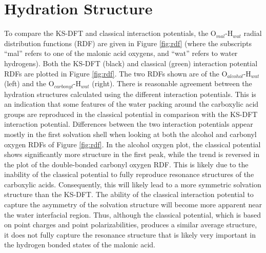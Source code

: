 \section {Hydration Structure}

To compare the KS-DFT and classical interaction potentials, the O$_{mal}$-H$_{wat}$ radial distribution functions (RDF) are given in Figure \ref{fig:rdf} (where the subscripts ``mal'' refers to one of the malonic acid oxygens, and ``wat'' refers to water hydrogens). Both the KS-DFT (black) and classical (green) interaction potential RDFs are plotted in Figure \ref{fig:rdf}. The two RDFs shown are of the O$_{alcohol}$-H$_{wat}$ (left) and the O$_{carbonyl}$-H$_{wat}$ (right). There is reasonable agreement between the hydration structures calculated using the different interaction potentials. This is an indication that some features of the water packing around the carboxylic acid groups are reproduced in the classical potential in comparison with the KS-DFT interaction potential. Differences between the two interaction potentials appear mostly in the first solvation shell when looking at both the alcohol and carbonyl oxygen RDFs of Figure \ref{fig:rdf}. In the alcohol oxygen plot, the classical potential shows significantly more structure in the first peak, while the trend is reversed in the plot of the double-bonded carbonyl oxygen RDF. This is likely due to the inability of the classical potential to fully reproduce resonance structures of the carboxylic acids. Consequently, this will likely lead to a more symmetric solvation structure than the KS-DFT. The ability of the classical interaction potential to capture the asymmetry of the solvation structure will become more apparent near the water interfacial region. Thus, although the classical potential, which is based on point charges and point polarizabilities, produces a similar average structure, it does not fully capture the resonance structure that is likely very important in the hydrogen bonded states of the malonic acid.

